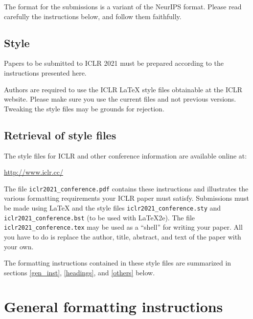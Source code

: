 \documentclass{article}
\begin{document}
The format for the submissions is a variant of the NeurIPS format.
Please read carefully the instructions below, and follow them
faithfully.

\subsection*{Style}

Papers to be submitted to ICLR 2021 must be prepared according to the
instructions presented here.


Authors are required to use the ICLR \LaTeX{} style files obtainable at the
ICLR website. Please make sure you use the current files and
not previous versions. Tweaking the style files may be grounds for rejection.

\subsection*{Retrieval of style files}

The style files for ICLR and other conference information are available online at:
\begin{center}
   \url{http://www.iclr.cc/}
\end{center}
The file \verb+iclr2021_conference.pdf+ contains these
instructions and illustrates the
various formatting requirements your ICLR paper must satisfy.
Submissions must be made using \LaTeX{} and the style files
\verb+iclr2021_conference.sty+ and \verb+iclr2021_conference.bst+ (to be used with \LaTeX{}2e). The file
\verb+iclr2021_conference.tex+ may be used as a ``shell'' for writing your paper. All you
have to do is replace the author, title, abstract, and text of the paper with
your own.

The formatting instructions contained in these style files are summarized in
sections \ref{gen_inst}, \ref{headings}, and \ref{others} below.

\section*{General formatting instructions}
\label{gen_inst}
\end{document}

